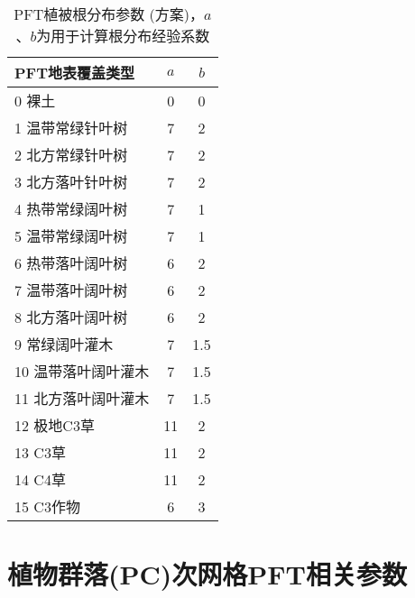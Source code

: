 \begin{table}[htbp]
  \centering
  \caption[PFT植被根分布参数 (\citet{zeng2001global}方案)]{PFT植被根分布参数 (\citet{zeng2001global}方案)，$a$、$b$为用于计算根分布经验系数}
  \label{tab:PFT植被根分布参数}
  \begin{tabular}{@{}lcc@{}}
    \toprule
    PFT地表覆盖类型     & $a$ & $b$ \\ \midrule
    0 裸土              & 0   & 0   \\
    1 温带常绿针叶树    & 7   & 2   \\
    2 北方常绿针叶树    & 7   & 2   \\
    3 北方落叶针叶树    & 7   & 2   \\
    4 热带常绿阔叶树    & 7   & 1   \\
    5 温带常绿阔叶树    & 7   & 1   \\
    6 热带落叶阔叶树    & 6   & 2   \\
    7 温带落叶阔叶树    & 6   & 2   \\
    8 北方落叶阔叶树    & 6   & 2   \\
    9 常绿阔叶灌木      & 7   & 1.5 \\
    10 温带落叶阔叶灌木 & 7   & 1.5 \\
    11 北方落叶阔叶灌木 & 7   & 1.5 \\
    12 极地C3草         & 11  & 2   \\
    13 C3草             & 11  & 2   \\
    14 C4草             & 11  & 2   \\
    15 C3作物           & 6   & 3   \\ \bottomrule
  \end{tabular}
\end{table}


\chapter{植物群落(PC)次网格PFT相关参数}\label{植物群落PC次网格PFT相关参数}

